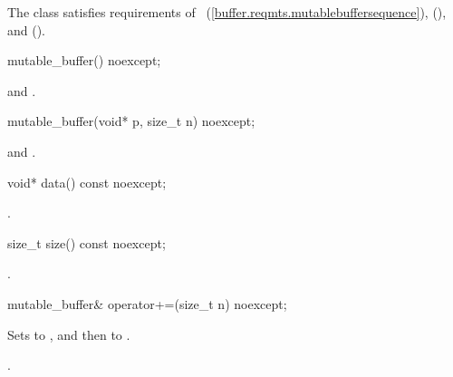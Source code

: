 \pnum
The  class satisfies requirements of ~(\ref{buffer.reqmts.mutablebuffersequence}),  (), and  ().

%
\begin{itemdecl}
mutable_buffer() noexcept;
\end{itemdecl}

\begin{itemdescr}
\pnum
\postconditions {} and .
\end{itemdescr}

%
\begin{itemdecl}
mutable_buffer(void* p, size_t n) noexcept;
\end{itemdecl}

\begin{itemdescr}
\pnum
\postconditions {} and .
\end{itemdescr}

%
\begin{itemdecl}
void* data() const noexcept;
\end{itemdecl}

\begin{itemdescr}
\pnum
\returns {}.
\end{itemdescr}

%
\begin{itemdecl}
size_t size() const noexcept;
\end{itemdecl}

\begin{itemdescr}
\pnum
\returns {}.
\end{itemdescr}

%
\begin{itemdecl}
mutable_buffer& operator+=(size_t n) noexcept;
\end{itemdecl}

\begin{itemdescr}
\pnum
\effects Sets  to , and then  to .

\pnum
\returns {}.
\end{itemdescr}


